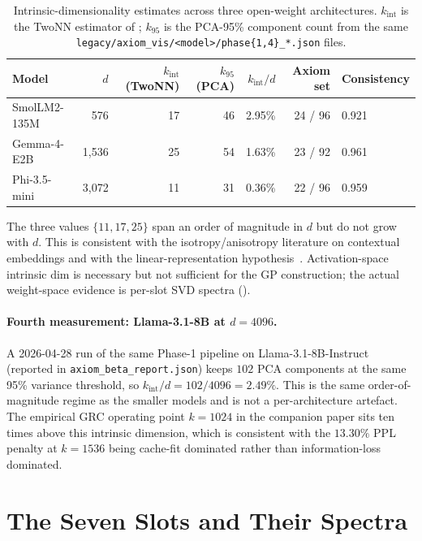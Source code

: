 \documentclass[11pt]{article}
\begin{document}
\begin{table}[h]\centering\small
\caption{Intrinsic-dimensionality estimates across three open-weight
architectures. $k_\text{int}$ is the TwoNN estimator of
\citet{facco2017twonn}; $k_{95}$ is the PCA-95\% component count from
the same \texttt{legacy/axiom\_vis/<model>/phase\{1,4\}\_*.json} files.}
\begin{tabular}{@{}lrrrrrl@{}}
\toprule
Model & $d$ & $k_\text{int}$ (TwoNN) & $k_{95}$ (PCA) & $k_\text{int}/d$ & Axiom set & Consistency \\
\midrule
SmolLM2-135M  & 576   & 17 & 46 & 2.95\% & 24 / 96 & 0.921 \\
Gemma-4-E2B   & 1{,}536 & 25 & 54 & 1.63\% & 23 / 92 & 0.961 \\
Phi-3.5-mini  & 3{,}072 & 11 & 31 & 0.36\% & 22 / 96 & 0.959 \\
\bottomrule
\end{tabular}
\end{table}

The three values $\{11,17,25\}$ span an order of magnitude in $d$ but do
not grow with $d$.  This is consistent with the
isotropy/anisotropy literature on contextual embeddings and with the
linear-representation hypothesis~\cite{elhage2022superposition}.
Activation-space intrinsic dim is necessary but not sufficient for the GP
construction; the actual weight-space evidence is per-slot SVD spectra
().

\paragraph{Fourth measurement: Llama-3.1-8B at $d{=}4096$.}
A 2026-04-28 run of the same Phase-1 pipeline on Llama-3.1-8B-Instruct
(reported in \texttt{axiom\_beta\_report.json}) keeps $102$ PCA components
at the same 95\% variance threshold, so $k_\text{int}/d = 102/4096 =
2.49\%$. This is the same order-of-magnitude regime as the smaller models
and is not a per-architecture artefact. The empirical GRC operating
point $k{=}1024$ in the companion paper sits ten times above this
intrinsic dimension, which is consistent with the $13.30\%$ PPL penalty
at $k{=}1536$ being cache-fit dominated rather than information-loss
dominated.

\section{The Seven Slots and Their Spectra}
\label{sec:spectra}
\end{document}
